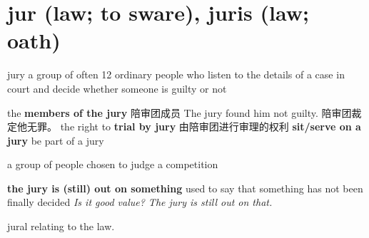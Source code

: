 \section{jur (law; to sware), juris (law; oath)}

\begin{DefWord}{jury}
    a group of often 12 ordinary people who listen to the details of a case in court and decide whether someone is guilty or not

    the \textbf{members of the jury} 陪审团成员
    The jury found him not guilty. 陪审团裁定他无罪。
    the right to \textbf{trial by jury} 由陪审团进行审理的权利
    \textbf{sit/serve on a jury} be part of a jury

    a group of people chosen to judge a competition


    \textbf{the jury is (still) out on something} used to say that something has not been finally decided
    \textit{Is it good value? The jury is still out on that.}

\end{DefWord}

\begin{DefWord}{jural}
    relating to the law.
\end{DefWord}

